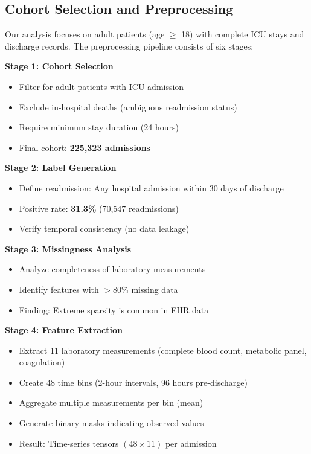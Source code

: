 \documentclass[conference]{IEEEtran}
\begin{document}
\subsection{Cohort Selection and Preprocessing}

Our analysis focuses on adult patients (age $\geq$ 18) with complete ICU stays and discharge records. The preprocessing pipeline consists of six stages:

\textbf{Stage 1: Cohort Selection}
\begin{itemize}
    \item Filter for adult patients with ICU admission
    \item Exclude in-hospital deaths (ambiguous readmission status)
    \item Require minimum stay duration (24 hours)
    \item Final cohort: \textbf{225,323 admissions}
\end{itemize}

\textbf{Stage 2: Label Generation}
\begin{itemize}
    \item Define readmission: Any hospital admission within 30 days of discharge
    \item Positive rate: \textbf{31.3\%} (70,547 readmissions)
    \item Verify temporal consistency (no data leakage)
\end{itemize}

\textbf{Stage 3: Missingness Analysis}
\begin{itemize}
    \item Analyze completeness of laboratory measurements
    \item Identify features with $>$80\% missing data
    \item Finding: Extreme sparsity is common in EHR data
\end{itemize}

\textbf{Stage 4: Feature Extraction}
\begin{itemize}
    \item Extract 11 laboratory measurements (complete blood count, metabolic panel, coagulation)
    \item Create 48 time bins (2-hour intervals, 96 hours pre-discharge)
    \item Aggregate multiple measurements per bin (mean)
    \item Generate binary masks indicating observed values
    \item Result: Time-series tensors $(48 \times 11)$ per admission
\end{itemize}
\end{document}
